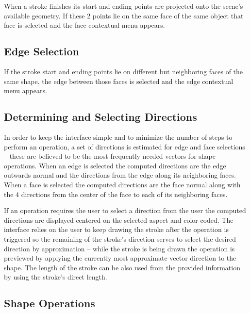 When a stroke finishes its start and ending points are projected onto the scene's available geometry.
If these 2 points lie on the same face of the same object that face is selected and the face contextual menu appears.



\subsection{Edge Selection}

If the stroke start and ending points lie on different but neighboring faces of the same shape, the edge between
those faces is selected and the edge contextual menu appears.



\subsection{Determining and Selecting Directions}

In order to keep the interface simple and to minimize the number of steps to perform an operation, a set of directions
is estimated for edge and face selections -- these are believed to be the most frequently needed vectors for shape operations.
When an edge is selected the computed directions are the edge outwards normal and the directions from the edge along its neighboring faces.
When a face is selected the computed directions are the face normal along with the 4 directions from the center of the face
to each of its neighboring faces.

If an operation requires the user to select a direction from the user the computed directions are displayed centered on the selected aspect
and color coded. The interface relies on the user to keep drawing the stroke after the operation is triggered so the remaining of the stroke's direction serves to select the desired direction by approximation -- while the stroke is being drawn the operation is previewed by applying the currently most approximate vector direction to the shape. The length of the stroke can be also used from the provided information by using the stroke's direct length.






\subsection{Shape Operations}

